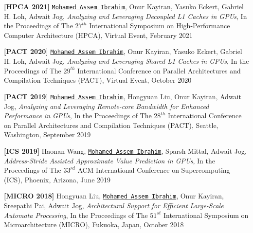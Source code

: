 \documentclass[10pt,a4]{article}
\begin{document}
\begin{description}
\item 
{\bf [HPCA 2021]}
{\tt \underline{Mohamed Assem Ibrahim}}, Onur Kayiran, Yasuko Eckert, Gabriel H. Loh, Adwait Jog,
{\it Analyzing and Leveraging Decoupled L1 Caches in GPUs},
In the Proceedings of The $27^{th}$ International Symposium on High-Performance Computer Architecture (HPCA),  
Virtual Event, February 2021

\item 
{\bf [PACT 2020]}
{\tt \underline{Mohamed Assem Ibrahim}}, Onur Kayiran, Yasuko Eckert, Gabriel H. Loh, Adwait Jog,
{\it Analyzing and Leveraging Shared L1 Caches in GPUs},
In the Proceedings of The $29^{th}$ International Conference on Parallel Architectures and Compilation Techniques (PACT), 
Virtual Event, October 2020

\item 
{\bf [PACT 2019]}
{\tt \underline{Mohamed Assem Ibrahim}}, Hongyuan Liu, Onur Kayiran, Adwait Jog,
{\it Analyzing and Leveraging Remote-core Bandwidth for Enhanced Performance in GPUs},
In the Proceedings of The $28^{th}$ International Conference on Parallel Architectures and Compilation Techniques (PACT), 
Seattle, Washington, September 2019

\item 
{\bf [ICS 2019]}
Haonan Wang, {\tt \underline{Mohamed Assem Ibrahim}}, Sparsh Mittal, Adwait Jog, 
{\it Address-Stride Assisted Approximate Value Prediction in GPUs},
In the Proceedings of The $33^{rd}$ ACM International Conference on Supercomputing (ICS), 
Phoenix, Arizona, June 2019

\item 
{\bf [MICRO 2018]}
Hongyuan Liu, {\tt \underline{Mohamed Assem Ibrahim}}, Onur Kayiran, Sreepathi Pai, Adwait Jog, 
{\it Architectural Support for Efficient Large-Scale Automata Processing},
In the Proceedings of The $51^{st}$ International Symposium on Microarchitecture (MICRO), 
Fukuoka, Japan, October 2018



\end{description}
\end{document}
